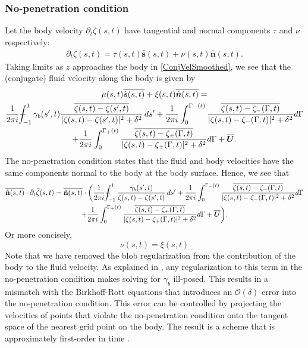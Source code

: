 \documentclass{article}[12pt]
\theoremstyle{Theorem}
\def\Xint#1{\mathchoice
   {\XXint\displaystyle\textstyle{#1}}%
   {\XXint\textstyle\scriptstyle{#1}}%
   {\XXint\scriptstyle\scriptscriptstyle{#1}}%
   {\XXint\scriptscriptstyle\scriptscriptstyle{#1}}%
   \!\int}
\def\XXint#1#2#3{{\setbox0=\hbox{$#1{#2#3}{\int}$}
     \vcenter{\hbox{$#2#3$}}\kern-.5\wd0}}
\def\dashint{\Xint-}
\begin{document}
\subsubsection{No-penetration condition}
Let the body velocity $\partial_t \zeta(s,t)$ have tangential and normal components $\tau$ and $\nu$ respectively: 
\begin{eqnarray}
    \partial_t\zeta(s,t) = \tau(s,t)\hat{\textbf{s}}(s,t) + \nu(s,t)\hat{\textbf{n}}(s,t).
\end{eqnarray} 
Taking limits as $z$ approaches the body in \eqref{ConjVelSmoothed}, we see that the (conjugate) fluid velocity along the body is given by 
\begin{multline}
    \mu(s,t)\overline{\hat{\boldsymbol{s}}(s,t)} + \xi(s,t)\overline{\hat{\boldsymbol{n}}(s,t)} = \\ 
    \frac{1}{2\pi i}\dashint_{-1}^{1}{\gamma_b(s',t)\frac{\overline{\zeta(s,t) - \zeta(s',t)}}{|\zeta(s,t) - \zeta(s',t)|^2 + \delta^2}\, ds'}  +  \frac{1}{2\pi i}\int_{0}^{\Gamma_-(t)}{\frac{\overline{\zeta(s,t) - \zeta_{-}(\Gamma,t)}}{|\zeta(s,t) - \zeta_{-}(\Gamma,t)|^2 + \delta^2}d\Gamma} \\ + \frac{1}{2\pi i}\int_{0}^{\Gamma_+(t)}{\frac{\overline{\zeta(s,t) - \zeta_{+}(\Gamma,t)}}{|\zeta(s,t) - \zeta_{+}(\Gamma,t)|^2 + \delta^2}d\Gamma} + \overline{\boldsymbol{U}}.
\end{multline}
The no-penetration condition states that the fluid and body velocities have the same components normal to the body at the body surface. Hence, we see that
\begin{multline}
    \overline{\hat{\textbf{n}}(s,t)}\cdot \partial_t\bar{\zeta}(s,t)  = 
        \overline{\hat{\textbf{n}}(s,t)}\cdot \bigg(\frac{1}{2\pi i}\dashint_{-1}^{1}{\frac{\gamma_b(s',t)}{\zeta(s,t) - \zeta(s',t)}\, ds'} + \frac{1}{2\pi i}\int_{0}^{\Gamma_-(t)}{\frac{\overline{\zeta(s,t) - \zeta_{-}(\Gamma,t)}}{|\zeta(s,t) - \zeta_{-}(\Gamma,t)|^2 + \delta^2}d\Gamma} \\ + \frac{1}{2\pi i}\int_{0}^{\Gamma_+(t)}{\frac{\overline{\zeta(s,t) - \zeta_{+}(\Gamma,t)}}{|\zeta(s,t) - \zeta_{+}(\Gamma,t)|^2 + \delta^2}d\Gamma} + \overline{\boldsymbol{U}}\bigg).
    \label{NoPenetration}
\end{multline}
Or more concisely, 
\begin{equation}
    \nu(s,t) = \xi(s,t)
\end{equation}
 Note that we have removed the blob regularization from the contribution of the body to the fluid velocity. As explained in \cite{loo2026comparisoninviscidviscousvortex}, any regularization to this term in the no-penetration condition makes solving for $\gamma_b$ ill-posed. This results in a mismatch with the Birkhoff-Rott equations that introduces an $\mathcal{O}(\delta)$ error into the no-penetration condition. This error can be controlled by projecting the velocities of points that violate the no-penetration condition onto the tangent space of the nearest grid point on the body. The result is a scheme that is approximately first-order in time \cite{loo2025falling}.
 \newline
 
\end{document}
